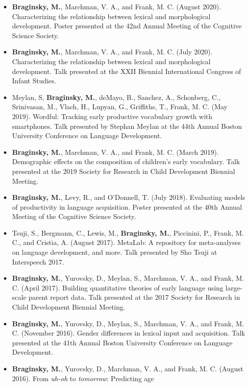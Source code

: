 \documentclass[11pt,]{article}
\begin{document}
\begin{itemize}
\item
  \textbf{Braginsky, M.}, Marchman, V. A., and Frank, M. C. (August
  2020). Characterizing the relationship between lexical and
  morphological development. Poster presented at the 42nd Annual Meeting
  of the Cognitive Science Society.
\item
  \textbf{Braginsky, M.}, Marchman, V. A., and Frank, M. C. (July 2020).
  Characterizing the relationship between lexical and morphological
  development. Talk presented at the XXII Biennial International
  Congress of Infant Studies.
\item
  Meylan, S, \textbf{Braginsky, M.}, deMayo, B., Sanchez, A., Schonberg,
  C., Srinivasan, M., Vlach, H., Lupyan, G., Griffiths, T., Frank, M. C.
  (May 2019). Wordful: Tracking early productive vocabulary growth with
  smartphones. Talk presented by Stephan Meylan at the 44th Annual
  Boston University Conference on Language Development.
\item
  \textbf{Braginsky, M.}, Marchman, V. A., and Frank, M. C. (March
  2019). Demographic effects on the composition of children's early
  vocabulary. Talk presented at the 2019 Society for Research in Child
  Development Biennial Meeting.
\item
  \textbf{Braginsky, M.}, Levy, R., and O'Donnell, T. (July 2018).
  Evaluating models of productivity in language acquisition. Poster
  presented at the 40th Annual Meeting of the Cognitive Science Society.
\item
  Tsuji, S., Bergmann, C., Lewis, M., \textbf{Braginsky, M.}, Piccinini,
  P., Frank, M. C., and Cristia, A. (August 2017). MetaLab: A repository
  for meta-analyses on language development, and more. Talk presented by
  Sho Tsuji at Interspeech 2017.
\item
  \textbf{Braginsky, M.}, Yurovsky, D., Meylan, S., Marchman, V. A., and
  Frank, M. C. (April 2017). Building quantitative theories of early
  language using large-scale parent report data. Talk presented at the
  2017 Society for Research in Child Development Biennial Meeting.
\item
  \textbf{Braginsky, M.}, Yurovsky, D., Meylan, S., Marchman, V. A., and
  Frank, M. C. (November 2016). Gender differences in lexical input and
  acquisition. Talk presented at the 41th Annual Boston University
  Conference on Language Development.
\item
  \textbf{Braginsky, M.}, Yurovsky, D., Marchman, V. A., and Frank, M.
  C. (August 2016). From \emph{uh-oh} to \emph{tomorrow}: Predicting age

\end{itemize}
\end{document}
